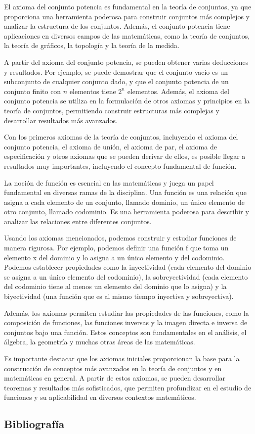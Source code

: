 El axioma del conjunto potencia es fundamental en la teoría de conjuntos, ya que proporciona una herramienta poderosa para construir conjuntos más complejos y analizar la estructura de los conjuntos. Además, el conjunto potencia tiene aplicaciones en diversos campos de las matemáticas, como la teoría de conjuntos, la teoría de gráficos, la topología y la teoría de la medida.

A partir del axioma del conjunto potencia, se pueden obtener varias deducciones y resultados. Por ejemplo, se puede demostrar que el conjunto vacío es un subconjunto de cualquier conjunto dado, y que el conjunto potencia de un conjunto finito con $n$ elementos tiene $2^{n}$ elementos. Además, el axioma del conjunto potencia se utiliza en la formulación de otros axiomas y principios en la teoría de conjuntos, permitiendo construir estructuras más complejas y desarrollar resultados más avanzados.

\bigskip

Con los primeros axiomas de la teoría de conjuntos, incluyendo el axioma del conjunto potencia, el axioma de unión, el axioma de par, el axioma de especificación y otros axiomas que se pueden derivar de ellos, es posible llegar a resultados muy importantes, incluyendo el concepto fundamental de función.

La noción de función es esencial en las matemáticas y juega un papel fundamental en diversas ramas de la disciplina. Una función es una relación que asigna a cada elemento de un conjunto, llamado dominio, un único elemento de otro conjunto, llamado codominio. Es una herramienta poderosa para describir y analizar las relaciones entre diferentes conjuntos.

Usando los axiomas mencionados, podemos construir y estudiar funciones de manera rigurosa. Por ejemplo, podemos definir una función f que toma un elemento x del dominio y lo asigna a un único elemento y del codominio. Podemos establecer propiedades como la inyectividad (cada elemento del dominio se asigna a un único elemento del codominio), la sobreyectividad (cada elemento del codominio tiene al menos un elemento del dominio que lo asigna) y la biyectividad (una función que es al mismo tiempo inyectiva y sobreyectiva).

Además, los axiomas permiten estudiar las propiedades de las funciones, como la composición de funciones, las funciones inversas y la imagen directa e inversa de conjuntos bajo una función. Estos conceptos son fundamentales en el análisis, el álgebra, la geometría y muchas otras áreas de las matemáticas.

Es importante destacar que los axiomas iniciales proporcionan la base para la construcción de conceptos más avanzados en la teoría de conjuntos y en matemáticas en general. A partir de estos axiomas, se pueden desarrollar teoremas y resultados más sofisticados, que permiten profundizar en el estudio de funciones y su aplicabilidad en diversos contextos matemáticos.

\subsection{Bibliografía}

\printbibliography[keyword={09}]
